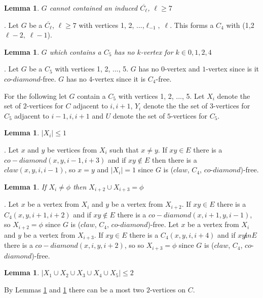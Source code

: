 \documentclass[12pt]{article}
\newtheorem{Lemma}[Theorem]{Lemma}
\def\CCD{($claw$, $C_4$, $co$-$diamond$)}
\begin{document}
\begin{Lemma}\label{lem:anti-odd-hole-free}
$G$ cannot contained an induced $\overline{C_\ell}$, $\ell \geq 7$
\end{Lemma}
. Let $G$ be a $\overline{C_\ell}$, $\ell \geq 7$ with vertices 1, 2, ...,$\ell_{-1},\; \ell$. This forms a $C_4$ with (1,2 $\ell-2,\; \ell-1$).

\begin{Lemma}\label{lem:c5-k-vertex}
$G$ which contains a $C_5$ has no $k$-vertex for $k \in {0, 1, 2, 4}$
\end{Lemma}
. Let $G$ be a $C_5$ with vertices 1, 2, ..., 5. $G$ has no $0$-vertex and $1$-vertex since is it $co$-$diamond$-free. $G$ has no $4$-vertex since it is $C_4$-free.

For the following let $G$ contain a $C_5$ with vertices 1, 2, ..., 5. Let $X_i$ denote the set of $2$-vertices for $C$ adjacent to $i, i+1$, $Y_i$ denote the the set of $3$-vertices for $C_5$ adjacent to $i-1, i, i+1$ and $U$ denote the set of $5$-vertices for $C_5$.

\begin{Lemma}\label{lem:max-2-xi}
$|X_i| \leq 1$
\end{Lemma}
. Let $x$ and $y$ be vertices from $X_i$ such that $x \neq y$. If $xy \in E$ there is a $co-diamond (x, y, i-1, i+3)$ and if $xy \not \in E$ then there is a $claw (x, y, i, i-1)$, so $x = y$ and $|X_i| = 1$ since $G$ is {\CCD}-free.

\begin{Lemma}\label{lem:xi-no-xi2}
If $X_i \neq \phi$ then $X_{i+2} \cup X_{i+3} = \phi$
\end{Lemma}
. Let $x$ be a vertex from $X_i$ and $y$ be a vertex from $X_{i+2}$. If $xy \in E$ there is a $C_4 (x, y, i+1, i+2)$ and if $xy \not \in E$ there is a $co-diamond (x,i+1, y, i-1)$, so $X_{i+2} = \phi$ since $G$ is {\CCD}-free. Let $x$ be a vertex from $X_i$ and $y$ be a vertex from $X_{i+3}$. If $xy \in E$ there is a $C_4 (x, y, i, i+4)$ and if $xy \not in E$ there is a $co-diamond (x, i, y, i+2)$, so so $X_{i+3} = \phi$  since $G$ is {\CCD}-free. 

\begin{Lemma}\label{lem:max-2-2K}
$|X_1 \cup X_2 \cup X_3 \cup X_4 \cup X_5| \leq 2$
\end{Lemma}
 By Lemmas \ref{lem:max-2-xi} and \ref{lem:xi-no-xi2} there can be a most two $2$-vertices on $C$.
\end{document}
